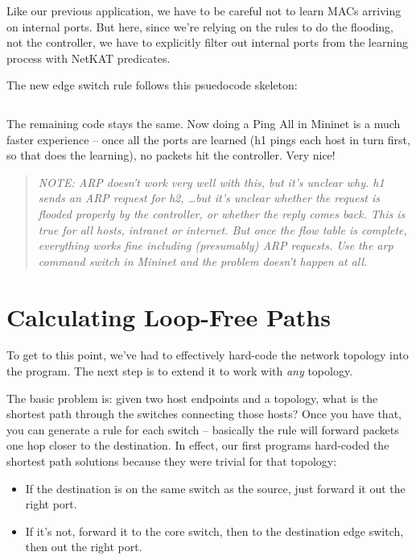 Like our previous application, we have to be careful not to learn MACs arriving on internal ports.
But here, since we're relying on the rules to do the flooding, not the controller, we have to 
explicitly filter out internal ports from the learning process with NetKAT predicates.

The new edge switch rule follows this psuedocode skeleton:

\inputminted[firstline=39,lastline=52]{python}{code/multiswitch_topologies/multiswitch2.py}

The remaining code stays the same.  Now doing a Ping All in Mininet is a much faster experience -- once all the
ports are learned (h1 pings each host in turn first, so that does the learning), no packets hit the controller.
Very nice!

\begin{quotation}
\emph{NOTE:  ARP doesn't work very well with this, but it's unclear why.  h1 sends an ARP request for
h2, \ldots but it's unclear whether the request is flooded properly by the controller, or whether the
reply comes back.  This is true for all hosts, intranet or internet.  But once the flow table is complete,
everything works fine including (presumably) ARP requests.   Use the arp command switch in Mininet 
and the problem doesn't happen at all.   }
\end{quotation}


\section{Calculating Loop-Free Paths}

To get to this point, we've had to effectively hard-code the network topology into the program.  The next step
is to extend it to work with \emph{any} topology.  

The basic problem is: given two host endpoints and a topology, what is the shortest path through the switches 
connecting those hosts?  Once you have that, you can generate a rule for each switch -- basically the 
rule will forward packets one hop closer to the destination.  In effect, our first programs hard-coded the shortest
path solutions because they were trivial for that topology:

\begin{itemize}
\item If the destination is on the same switch as the source, just forward it out the right port.
\item If it's not, forward it to the core switch, then to the destination edge switch, then out the right port.
\end{itemize}

